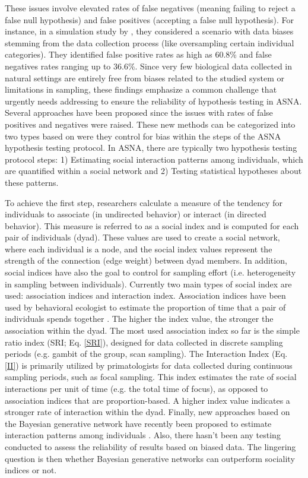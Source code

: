 \documentclass[Afour,sageh,times]{sagej}
\begin{document}
These issues involve elevated rates of false negatives (meaning failing to reject a false null hypothesis) and false positives (accepting a false null hypothesis). For instance, in a simulation study by \citet{Puga2021}, they considered a scenario with data biases stemming from the data collection process (like oversampling certain individual categories). They identified false positive rates as high as 60.8\% and false negatives rates ranging up to 36.6\%. Since very few biological data collected in natural settings are entirely free from biases related to the studied system or limitations in sampling, these findings emphasize a common challenge that urgently needs addressing to ensure the reliability of hypothesis testing in ASNA. Several approaches have been proposed since the issues with rates of false positives and negatives were raised. These new methods can be categorized into two types based on were they control for bias within the steps of the ASNA hypothesis testing protocol. In ASNA, there are typically two hypothesis testing protocol steps: 1) Estimating social interaction patterns among individuals, which are quantified within a social network and 2) Testing statistical hypotheses about these patterns.

To achieve the first step, researchers calculate a measure of the tendency for individuals to associate (in undirected behavior) or interact (in directed behavior). This measure is referred to as a social index and is computed for each pair of individuals (dyad). These values are used to create a social network, where each individual is a node, and the social index values represent the strength of the connection (edge weight) between dyad members. In addition, social indices have also the goal to control for sampling effort (i.e. heterogeneity in sampling between individuals). Currently two main types of social index are used: association indices \citep{hubalek1982coefficients, sailer1984proximity} and interaction index. Association indices have been used by behavioral ecologist to estimate the proportion of time that a pair of individuals spends together \citep{whitehead2008analyzing}. The higher the index value, the stronger the association within the dyad. The most used association index so far is the simple ratio index (SRI; Eq. \ref{SRI}), designed for data collected in discrete sampling periods (e.g. gambit of the group, scan sampling). The Interaction Index (Eq. \ref{II}) is primarily utilized by primatologists for data collected during continuous sampling periods, such as focal sampling. This index estimates the rate of social interactions per unit of time (e.g. the total time of focus), as opposed to association indices that are proportion-based. A higher index value indicates a stronger rate of interaction within the dyad. Finally, new approaches based on the Bayesian generative network have recently been proposed to estimate interaction patterns among individuals \citep{hart2023bison, Ross2023JAE}. Also, there hasn't been any testing conducted to assess the reliability of results based on biased data. The lingering question is then whether Bayesian generative networks can outperform sociality indices or not.
\end{document}
